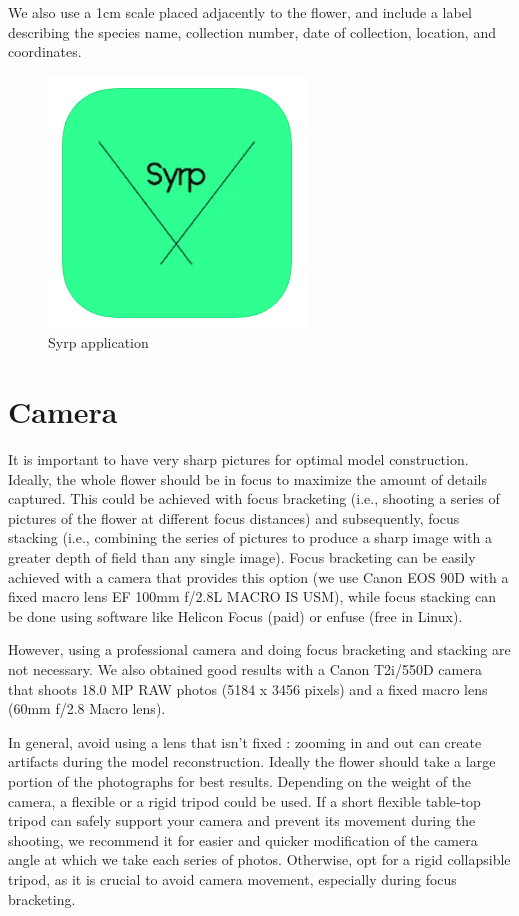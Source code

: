 \documentclass[
]{book}
\begin{document}
We also use a 1cm scale placed adjacently to the flower, and include a label describing the species name, collection number, date of collection, location, and coordinates.

\begin{figure}

{\centering \includegraphics[width=0.2\linewidth]{Figures/Syrp_app} 

}

\caption{Syrp application}\label{fig:Syrp}
\end{figure}

\hypertarget{camera}{%
\section{Camera}\label{camera}}

It is important to have very sharp pictures for optimal model
construction. Ideally, the whole flower should be in focus to maximize the amount
of details captured. This could be achieved with focus bracketing (i.e., shooting a series of pictures of the flower at different focus distances) and subsequently, focus stacking (i.e., combining the series of pictures to produce a sharp image with a greater depth of field than any single image). Focus bracketing can be easily achieved with a camera that provides this option (we use Canon EOS 90D with a fixed macro lens EF 100mm f/2.8L MACRO IS USM), while focus stacking can be done using software like Helicon Focus (paid) or enfuse (free in Linux).

However, using a professional camera and doing focus bracketing and stacking are not necessary. We also
obtained good results with a Canon T2i/550D camera that shoots 18.0 MP
RAW photos (5184 x 3456 pixels) and a fixed macro lens (60mm f/2.8 Macro lens).

In general, avoid using a lens that isn't fixed : zooming
in and out can create artifacts during the model reconstruction. Ideally
the flower should take a large portion of the photographs for best
results. Depending on the weight of the camera, a flexible or a rigid tripod could be used. If a short flexible table-top tripod can safely support your camera and prevent its movement during the shooting, we recommend it for easier and quicker modification of the camera angle at which we take each series of photos. Otherwise, opt for a rigid collapsible tripod, as it is crucial to avoid camera movement, especially during focus bracketing.
\end{document}
